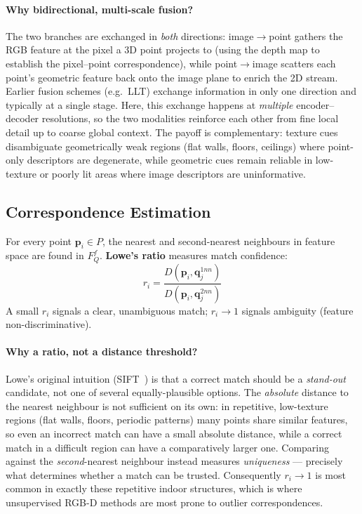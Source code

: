 \documentclass[11pt,a4paper]{article}
\begin{document}
\paragraph{Why bidirectional, multi-scale fusion?}
The two branches are exchanged in \emph{both} directions: image$\to$point gathers the
RGB feature at the pixel a 3D point projects to (using the depth map to establish the
pixel--point correspondence), while point$\to$image scatters each point's geometric
feature back onto the image plane to enrich the 2D stream. Earlier fusion schemes (e.g.\
LLT) exchange information in only one direction and typically at a single stage. Here,
this exchange happens at \emph{multiple} encoder--decoder resolutions, so the two
modalities reinforce each other from fine local detail up to coarse global context.
The payoff is complementary: texture cues disambiguate geometrically weak regions
(flat walls, floors, ceilings) where point-only descriptors are degenerate, while
geometric cues remain reliable in low-texture or poorly lit areas where image
descriptors are uninformative.

\subsection{Correspondence Estimation}
\label{sec:corresp}

For every point $\mathbf{p}_i \in P$, the nearest and second-nearest neighbours in feature
space are found in $F_Q^f$. \textbf{Lowe's ratio} measures match confidence:
\begin{equation}
  r_i = \frac{D(\mathbf{p}_i, \mathbf{q}_j^{1nn})}{D(\mathbf{p}_i, \mathbf{q}_j^{2nn})}
  \tag{2}
\end{equation}
A small $r_i$ signals a clear, unambiguous match; $r_i \to 1$ signals ambiguity
(feature non-discriminative).

\paragraph{Why a ratio, not a distance threshold?}
Lowe's original intuition (SIFT~\cite{lowe2004sift}) is that a correct match should be a
\emph{stand-out} candidate, not one of several equally-plausible options. The
\emph{absolute} distance to the nearest neighbour is not sufficient on its own: in
repetitive, low-texture regions (flat walls, floors, periodic patterns) many points share
similar features, so even an incorrect match can have a small absolute distance, while a
correct match in a difficult region can have a comparatively larger one. Comparing against
the \emph{second}-nearest neighbour instead measures \emph{uniqueness} — precisely what
determines whether a match can be trusted. Consequently $r_i \to 1$ is most common in
exactly these repetitive indoor structures, which is where unsupervised RGB-D methods are
most prone to outlier correspondences.
\end{document}
